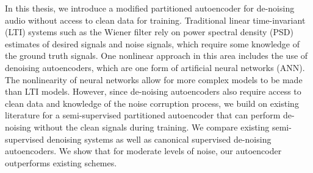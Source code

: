 
In this thesis, we introduce a modified partitioned autoencoder for de-noising audio without access to clean data for training. Traditional linear time-invariant (LTI) systems such as the Wiener filter rely on power spectral density (PSD) estimates of desired signals and noise signals, which require some knowledge of the ground truth signals. One nonlinear approach in this area includes the use of denoising autoencoders, which are one form of artificial neural networks (ANN). The nonlinearity of neural networks allow for more complex models to be made than LTI models. However, since de-noising autoencoders also require access to clean data and knowledge of the noise corruption process, we build on existing literature for a semi-supervised partitioned autoencoder that can perform de-noising without the clean signals during training. We compare existing semi-supervised denoising systems as well as canonical supervised de-noising autoencoders. We show that for moderate levels of noise, our autoencoder outperforms existing schemes.
